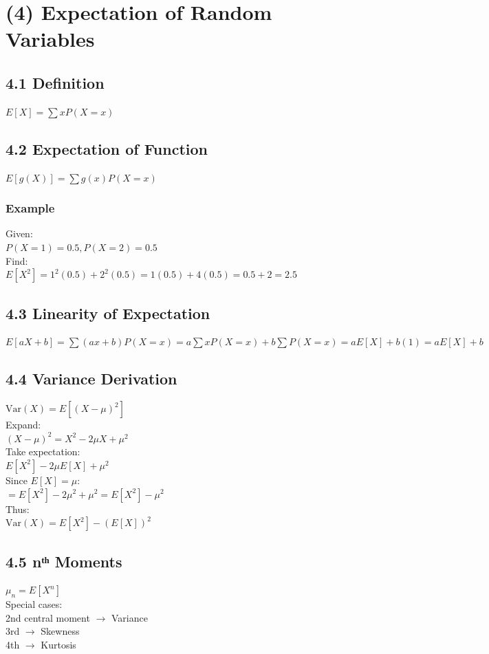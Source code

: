 \documentclass{article}
\begin{document}
\section{(4) Expectation of Random Variables}

\subsection{4.1 Definition}
$E[X] = \sum xP(X=x)$

\subsection{4.2 Expectation of Function}
$E[g(X)] = \sum g(x)P(X=x)$

\subsubsection{Example}
Given: \\
$P(X=1)=0.5, P(X=2)=0.5$ \\
Find: \\
$E[X^2] = 1^2(0.5) + 2^2(0.5) = 1(0.5) + 4(0.5) = 0.5 + 2 = 2.5$

\subsection{4.3 Linearity of Expectation}
$E[aX+b] = \sum (ax+b)P(X=x) = a\sum xP(X=x) + b\sum P(X=x) = aE[X] + b(1) = aE[X]+b$

\subsection{4.4 Variance Derivation}
$\text{Var}(X) = E[(X-\mu)^2]$ \\
Expand: \\
$(X-\mu)^2 = X^2 - 2\mu X + \mu^2$ \\
Take expectation: \\
$E[X^2] - 2\mu E[X] + \mu^2$ \\
Since $E[X]=\mu$: \\
$= E[X^2] - 2\mu^2 + \mu^2 = E[X^2] - \mu^2$ \\
Thus: \\
$\text{Var}(X) = E[X^2]-(E[X])^2$

\subsection{4.5 nᵗʰ Moments}
$\mu_n = E[X^n]$ \\
Special cases: \\
2nd central moment $\rightarrow$ Variance \\
3rd $\rightarrow$ Skewness \\
4th $\rightarrow$ Kurtosis
\end{document}
